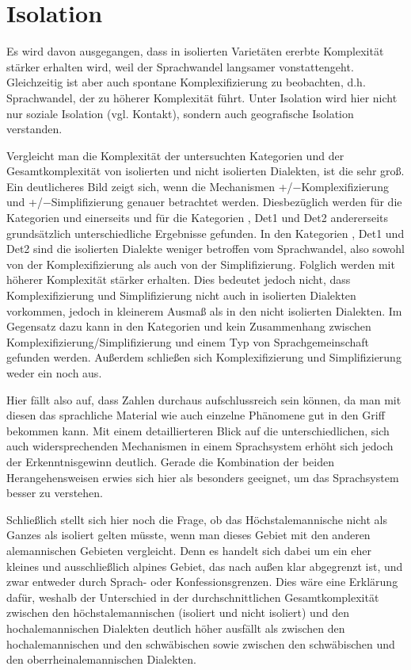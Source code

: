 \section{Isolation} Es wird davon ausgegangen, dass in isolierten Varietäten ererbte Komplexität stärker erhalten wird, weil der Sprachwandel langsamer vonstattengeht. Gleichzeitig ist aber auch spontane Komplexifizierung zu beobachten, d.h. Sprachwandel, der zu höherer Komplexität führt. Unter Isolation wird hier nicht nur soziale Isolation (vgl. Kontakt), sondern auch geografische Isolation verstanden.

Vergleicht man die Komplexität der untersuchten Kategorien und der Gesamtkomplexität von isolierten und nicht isolierten Dialekten, ist die  sehr groß. Ein deutlicheres Bild zeigt sich, wenn die Mechanismen +/−Kom\-ple\-xi\-fi\-zie\-rung und +/−Sim\-pli\-fi\-zie\-rung genauer betrachtet werden. Diesbezüglich werden für die Kategorien  und  einerseits und für die Kategorien , Det1 und Det2 andererseits grundsätzlich unterschiedliche Ergebnisse gefunden. In den Kategorien , Det1 und Det2 sind die isolierten Dialekte weniger betroffen vom Sprachwandel, also sowohl von der Komplexifizierung als auch von der Simplifizierung. Folglich werden  mit höherer Komplexität stärker erhalten. Dies bedeutet jedoch nicht, dass Komplexifizierung und Simplifizierung nicht auch in isolierten Dialekten vorkommen, jedoch in kleinerem Ausmaß als in den nicht isolierten Dialekten. Im Gegensatz dazu kann in den Kategorien  und  kein Zusammenhang zwischen Komplexifizierung/Simplifizierung und einem Typ von Sprachgemeinschaft gefunden werden. Außerdem schließen sich Komplexifizierung und Simplifizierung weder ein noch aus.

Hier fällt also auf, dass Zahlen durchaus aufschlussreich sein können, da man mit diesen das sprachliche Material wie auch einzelne Phänomene gut in den Griff bekommen kann. Mit einem detaillierteren Blick auf die unterschiedlichen, sich auch widersprechenden Mechanismen in einem Sprachsystem erhöht sich jedoch der Erkenntnisgewinn deutlich. Gerade die Kombination der beiden Herangehensweisen erwies sich hier als besonders geeignet, um das Sprachsystem besser zu verstehen.

Schließlich stellt sich hier noch die Frage, ob das Höchstalemannische nicht als Ganzes als isoliert gelten müsste, wenn man dieses Gebiet mit den anderen alemannischen Gebieten vergleicht. Denn es handelt sich dabei um ein eher kleines und ausschließlich alpines Gebiet, das nach außen klar abgegrenzt ist, und zwar entweder durch Sprach- oder Konfessionsgrenzen. Dies wäre eine Erklärung dafür, weshalb der Unterschied in der durchschnittlichen Gesamtkomplexität zwischen den höchstalemannischen (isoliert und nicht isoliert) und den hochalemannischen Dialekten deutlich höher ausfällt als zwischen den hochalemannischen und den schwäbischen sowie zwischen den schwäbischen und den oberrheinalemannischen Dialekten.


